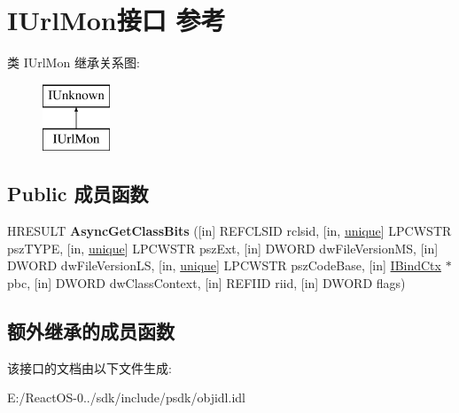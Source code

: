 \hypertarget{interface_i_url_mon}{}\section{I\+Url\+Mon接口 参考}
\label{interface_i_url_mon}
类 I\+Url\+Mon 继承关系图\+:\begin{figure}[H]
\begin{center}
\leavevmode
\includegraphics[height=2.000000cm]{interface_i_url_mon}
\end{center}
\end{figure}
\subsection*{Public 成员函数}
\begin{DoxyCompactItemize}
\item 
\mbox{\label{interface_i_url_mon_a6919dd6c1765f6ddae7241c7ab75c593}} 
H\+R\+E\+S\+U\+LT {\bfseries Async\+Get\+Class\+Bits} (\mbox{[}in\mbox{]} R\+E\+F\+C\+L\+S\+ID rclsid, \mbox{[}in, \hyperlink{interfaceunique}{unique}\mbox{]} L\+P\+C\+W\+S\+TR psz\+T\+Y\+PE, \mbox{[}in, \hyperlink{interfaceunique}{unique}\mbox{]} L\+P\+C\+W\+S\+TR psz\+Ext, \mbox{[}in\mbox{]} D\+W\+O\+RD dw\+File\+Version\+MS, \mbox{[}in\mbox{]} D\+W\+O\+RD dw\+File\+Version\+LS, \mbox{[}in, \hyperlink{interfaceunique}{unique}\mbox{]} L\+P\+C\+W\+S\+TR psz\+Code\+Base, \mbox{[}in\mbox{]} \hyperlink{interface_i_bind_ctx}{I\+Bind\+Ctx} $\ast$pbc, \mbox{[}in\mbox{]} D\+W\+O\+RD dw\+Class\+Context, \mbox{[}in\mbox{]} R\+E\+F\+I\+ID riid, \mbox{[}in\mbox{]} D\+W\+O\+RD flags)
\end{DoxyCompactItemize}
\subsection*{额外继承的成员函数}


该接口的文档由以下文件生成\+:\begin{DoxyCompactItemize}
\item 
E\+:/\+React\+O\+S-\/0../sdk/include/psdk/objidl.\+idl\end{DoxyCompactItemize}
